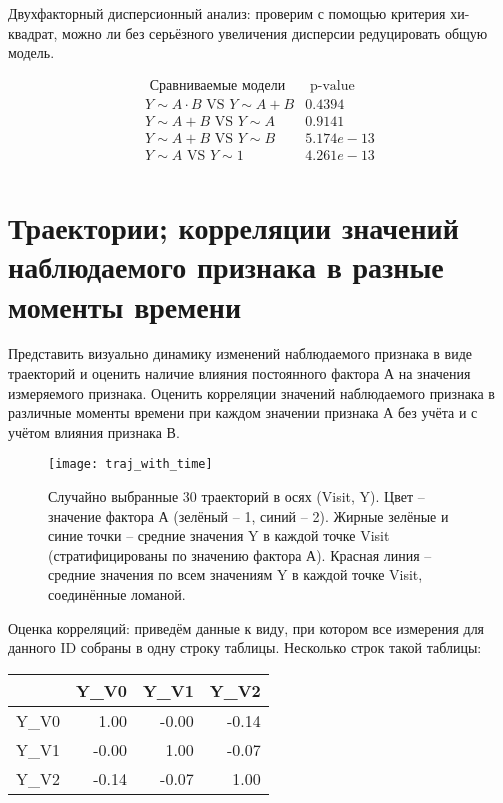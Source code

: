 \documentclass[a4paper,12pt]{article}
\begin{document}
Двухфакторный дисперсионный анализ: проверим с помощью критерия хи-квадрат, можно ли без серьёзного увеличения дисперсии редуцировать общую модель.

\[
\begin{array}{c|c}
	\text{ Сравниваемые модели } & \text{ p-value } \\
	\hline
    Y \sim A \cdot B  \text{ VS } Y \sim A + B & 0.4394 \\
    Y \sim A + B \text{ VS } Y \sim A & 0.9141 \\
	Y \sim A + B \text{ VS } Y \sim B & 5.174e-13 \\
	Y \sim A \text{ VS } Y \sim 1 & 4.261e-13 \\
\end{array}
\]


\section{ Траектории; корреляции значений наблюдаемого признака в разные моменты времени }
\label{section:trajectories}

\begin{leftbar}
Представить визуально динамику изменений наблюдаемого признака в виде траекторий и оценить наличие влияния постоянного фактора А на значения измеряемого признака.
Оценить корреляции значений наблюдаемого признака в различные моменты времени при каждом значении признака А без учёта и с учётом влияния признака В.
\end{leftbar}

\begin{figure}[H]
\label{img:traj_with_time}
\centering\texttt{[image: traj\_with\_time]}
\caption{ Случайно выбранные 30 траекторий в осях (Visit, Y). Цвет -- значение фактора А (зелёный -- 1, синий -- 2).
Жирные зелёные и синие точки -- средние значения Y в каждой точке Visit (стратифицированы по значению фактора А).
Красная линия -- средние значения по всем значениям Y в каждой точке Visit, соединённые ломаной.
}
\end{figure}

Оценка корреляций: приведём данные к виду, при котором все измерения для данного ID собраны в одну строку таблицы.
Несколько строк такой таблицы:

\begin{table}[H]
	\centering
	\begin{tabular}{rrrr}
        \hline
        & Y\_V0 & Y\_V1 & Y\_V2 \\
        \hline
        Y\_V0 & 1.00 & -0.00 & -0.14 \\
        Y\_V1 & -0.00 & 1.00 & -0.07 \\
        Y\_V2 & -0.14 & -0.07 & 1.00 \\
        \hline
    \end{tabular}
\end{table}
\end{document}
